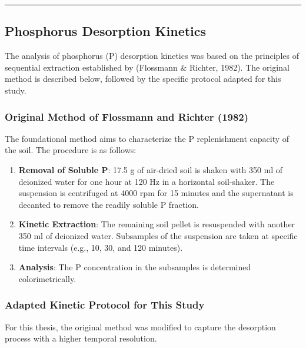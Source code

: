 \documentclass[
  a4paper,
]{article}
\providecommand{\tightlist}{%
  \setlength{\itemsep}{0pt}\setlength{\parskip}{0pt}}
\begin{document}
\begin{center}\rule{0.5\linewidth}{0.5pt}\end{center}

\subsection{Phosphorus Desorption
Kinetics}\label{sec-phosphorus-desorption-kinetics}

The analysis of phosphorus (P) desorption kinetics was based on the
principles of sequential extraction established by (Flossmann \&
Richter, 1982). The original method is described below, followed by the
specific protocol adapted for this study.

\subsubsection{Original Method of Flossmann and Richter
(1982)}\label{original-method-of-flossmann-and-richter-1982}

The foundational method aims to characterize the P replenishment
capacity of the soil. The procedure is as follows:

\begin{enumerate}
\def\labelenumi{\arabic{enumi}.}
\tightlist
\item
  \textbf{Removal of Soluble P}: 17.5 g of air-dried soil is shaken with
  350 ml of deionized water for one hour at 120 Hz in a horizontal
  soil-shaker. The suspension is centrifuged at 4000 rpm for 15 minutes
  and the supernatant is decanted to remove the readily soluble P
  fraction.
\item
  \textbf{Kinetic Extraction}: The remaining soil pellet is resuspended
  with another 350 ml of deionized water. Subsamples of the suspension
  are taken at specific time intervals (e.g., 10, 30, and 120 minutes).
\item
  \textbf{Analysis}: The P concentration in the subsamples is determined
  colorimetrically.
\end{enumerate}

\subsubsection{Adapted Kinetic Protocol for This
Study}\label{sec-adapted-kinetic-protocol-for-this-study}

For this thesis, the original method was modified to capture the
desorption process with a higher temporal resolution.
\end{document}
